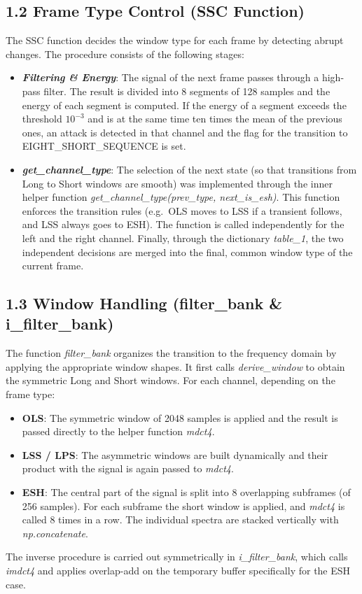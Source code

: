 \documentclass[11pt,twocolumn]{article}
\newcommand{\fn}[1]{\textit{#1}}
\newcommand{\sub}[1]{\subsection*{#1}}
\begin{document}
\sub{1.2 Frame Type Control (SSC Function)}
The SSC function decides the window type for each frame by detecting abrupt changes. The procedure consists of the following stages:
\begin{itemize}
  \item \textbf{\textit{Filtering \& Energy}}: The signal of the next frame passes through a high-pass filter. The result is divided into 8 segments of 128 samples and the energy of each segment is computed. If the energy of a segment exceeds the threshold $10^{-3}$ and is at the same time ten times the mean of the previous ones, an attack is detected in that channel and the flag for the transition to EIGHT\_SHORT\_SEQUENCE is set.
  \item \textbf{\fn{get\_channel\_type}}: The selection of the next state (so that transitions from Long to Short windows are smooth) was implemented through the inner helper function \fn{get\_channel\_type(prev\_type, next\_is\_esh)}. This function enforces the transition rules (e.g.\ OLS moves to LSS if a transient follows, and LSS always goes to ESH). The function is called independently for the left and the right channel. Finally, through the dictionary \fn{table\_1}, the two independent decisions are merged into the final, common window type of the current frame.
\end{itemize}

\sub{1.3 Window Handling (filter\_bank \& i\_filter\_bank)}
The function \fn{filter\_bank} organizes the transition to the frequency domain by applying the appropriate window shapes. It first calls \fn{derive\_window} to obtain the symmetric Long and Short windows. For each channel, depending on the frame type:
\begin{itemize}
  \item \textbf{OLS}: The symmetric window of 2048 samples is applied and the result is passed directly to the helper function \fn{mdct4}.
  \item \textbf{LSS / LPS}: The asymmetric windows are built dynamically and their product with the signal is again passed to \fn{mdct4}.
  \item \textbf{ESH}: The central part of the signal is split into 8 overlapping subframes (of 256 samples). For each subframe the short window is applied, and \fn{mdct4} is called 8 times in a row. The individual spectra are stacked vertically with \fn{np.concatenate}.
\end{itemize}
The inverse procedure is carried out symmetrically in \fn{i\_filter\_bank}, which calls \fn{imdct4} and applies overlap-add on the temporary buffer specifically for the ESH case.
\end{document}
